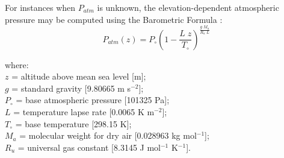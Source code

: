 \noindent For instances when $P_{atm}$ is unknown, the elevation-dependent atmospheric pressure may be computed using the Barometric Formula \parencite{allen98}:
%
\begin{equation}
\label{eq:pz}
    P_{atm}\left( z \right) = P_{\circ} \left( 
    	1 - \frac{L\; z}{T_{\circ}} 
    \right)^{\frac{g\; M_a}{R_u\; L}}
\end{equation}

\noindent where:\\
\indent $z$ = altitude above mean sea level [m];\\
\indent $g$ = standard gravity [9.80665 m s$^{-2}$];\\
\indent $P_{\circ}$ = base atmospheric pressure [101325 Pa];\\
\indent $L$ = temperature lapse rate [0.0065 K m$^{-2}$];\\
\indent $T_{\circ}$ = base temperature [298.15 K];\\
\indent $M_a$ = molecular weight for dry air [0.028963 kg mol$^{-1}$];\\
\indent $R_u$ = universal gas constant [8.3145 J mol$^{-1}$ K$^{-1}$].\\


